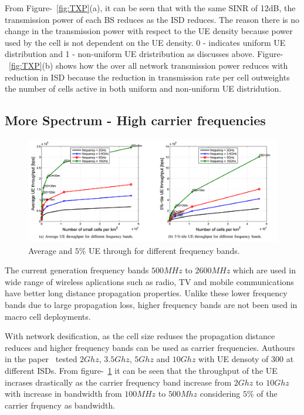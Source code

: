 \documentclass[12pt,onecolumn]{IEEEtran}
\begin{document}
From Figure-~\ref{fig:TXP}(a), it can be seen that with the same SINR of 12dB, the transmission power of each BS reduces as the ISD reduces. The reason there is no change in the transmission power with respect to the UE density because power used by the cell is not dependent on the UE density. 0 - indicates uniform UE distribution and 1 - non-uniform UE dristribution as discusses above. Figure-~\ref{fig:TXP}(b) shows how the over all network transmission power reduces with reduction in ISD because the reduction in transmission rate per cell outweights the number of cells active in both uniform and non-uniform UE distridution.

\subsection{More Spectrum - High carrier frequencies}
\label{subsec:MSF}

\begin{figure}[ht]
\includegraphics[scale=0.32]{high_freq}
\centering
\caption{Average and $5\%$ UE through for different frequency bands.~\cite{main_paper}}
\label{fig:HF}
\end{figure}

The current generation frequency bands $500MHz$ to $2600MHz$ which are used in wide range of wireless aplications such as radio, TV and mobile communications have better long distance propagation properties. Unlike these lower frequency bands due to large propagation loss, higher frequency bands are not been used in macro cell deployments.

With network desification, as the cell size reduses the propagation distance reduces and higher frequency bands can be used as carrier frequencies. Authours in the paper~\cite{main_paper} tested $2Ghz$, $3.5Ghz$, $5Ghz$ and $10Ghz$ with UE densoty of 300 at different ISDs. From figure-~\ref{fig:HF} it can be seen that the throughput of the UE incrases drastically as the carrier frequency band increase from $2Ghz$ to $10Ghz$ with increase in bandwidth from $100MHz$ to $500Mhz$ considering $5\%$ of the carrier frquency as bandwidth. 
\end{document}
